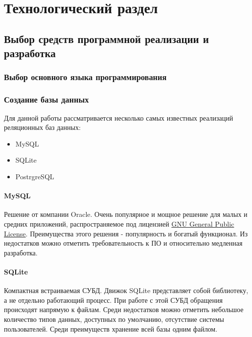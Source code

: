 \chapter{Технологический раздел}

%
\section{Выбор средств программной реализации и разработка}

\subsection{Выбор основного языка программирования}

\subsection{Создание базы данных}

Для данной работы рассматривается несколько самых известных реализаций реляционных баз данных:

\begin{itemize}
    \item MySQL
    \item SQLite
    \item PostrgreSQL
\end{itemize}

\subsubsection{MySQL}

Решение от компании Oracle. Очень популярное и мощное решение для малых и средних приложений, распространяемое под лицензией \href{https://ru.wikipedia.org/wiki/GNU_General_Public_License}{GNU General Public License}. Преимущества этого решения - популярность и богатый функционал. Из недостатков можно отметить требовательность к ПО и относительно медленная разработка.

\subsubsection{SQLite}

Компактная встраиваемая СУБД. Движок SQLite представляет собой библиотеку, а не отдельно работающий процесс. При работе с этой СУБД обращения происходят напрямую к файлам. Среди недостатков можно отметить небольшое количество типов данных, доступных по умолчанию, отсутствие системы пользователей. Среди преимуществ хранение всей базы одним файлом.

